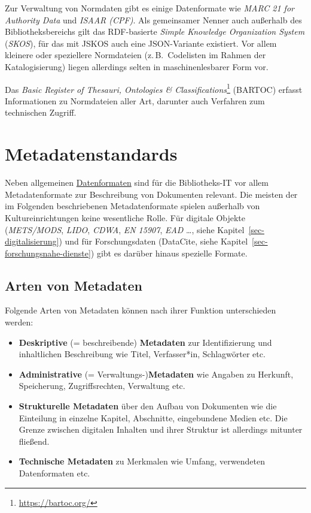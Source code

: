 \documentclass[
  11pt,
  letterpaper,
  DIV=11,
  twoside]{scrreprt}
\DeclareRobustCommand{\href}[2]{#2\footnote{\url{#1}}}
\begin{document}
Zur Verwaltung von Normdaten gibt es einige Datenformate wie \emph{MARC
21 for Authority Data} und \emph{ISAAR (CPF)}. Als gemeinsamer Nenner
auch außerhalb des Bibliotheksbereichs gilt das RDF-basierte
\emph{Simple Knowledge Organization System} (\emph{SKOS}), für das mit
JSKOS auch eine JSON-Variante existiert. Vor allem kleinere oder
speziellere Normdateien (z.\,B.~Codelisten im Rahmen der
Katalogisierung) liegen allerdings selten in maschinenlesbarer Form vor.

Das \href{https://bartoc.org/}{\emph{Basic Register of Thesauri,
Ontologies \& Classifications}} (BARTOC) erfasst Informationen zu
Normdateien aller Art, darunter auch Verfahren zum technischen Zugriff.

\section{Metadatenstandards}\label{metadatenstandards}

Neben allgemeinen \hyperref[datenformate]{Datenformaten} sind für die
Bibliotheks-IT vor allem Metadatenformate zur Beschreibung von
Dokumenten relevant. Die meisten der im Folgenden beschriebenen
Metadatenformate spielen außerhalb von Kultureinrichtungen keine
wesentliche Rolle. Für digitale Objekte (\emph{METS/MODS}, \emph{LIDO},
\emph{CDWA}, \emph{EN 15907}, \emph{EAD} \ldots, siehe
Kapitel~\ref{sec-digitalisierung}) und für Forschungsdaten (DataCite,
siehe Kapitel~\ref{sec-forschungsnahe-dienste}) gibt es darüber hinaus
spezielle Formate.

\subsection{Arten von Metadaten}\label{sec-arten-von-metadaten}

Folgende Arten von Metadaten können nach ihrer Funktion unterschieden
werden:

\begin{itemize}
\item
  \textbf{Deskriptive} (= beschreibende) \textbf{Metadaten} zur
  Identifizierung und inhaltlichen Beschreibung wie Titel, Verfasser*in,
  Schlagwörter etc.
\item
  \textbf{Administrative} (= Verwaltungs-)\textbf{Metadaten} wie Angaben
  zu Herkunft, Speicherung, Zugriffsrechten, Verwaltung etc.
\item
  \textbf{Strukturelle Metadaten} über den Aufbau von Dokumenten wie die
  Einteilung in einzelne Kapitel, Abschnitte, eingebundene Medien etc.
  Die Grenze zwischen digitalen Inhalten und ihrer Struktur ist
  allerdings mitunter fließend.
\item
  \textbf{Technische Metadaten} zu Merkmalen wie Umfang, verwendeten
  Datenformaten etc.
\end{itemize}
\end{document}
